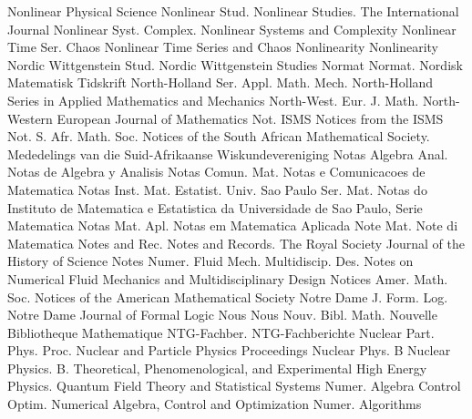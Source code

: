 {Nonlinear Physical Science}
{Nonlinear Stud.}
{Nonlinear Studies. The International Journal}
{Nonlinear Syst. Complex.}
{Nonlinear Systems and Complexity}
{Nonlinear Time Ser. Chaos}
{Nonlinear Time Series and Chaos}
{Nonlinearity}
{Nonlinearity}
{Nordic Wittgenstein Stud.}
{Nordic Wittgenstein Studies}
{Normat}
{Normat. Nordisk Matematisk Tidskrift}
{North-Holland Ser. Appl. Math. Mech.}
{North-Holland Series in Applied Mathematics and Mechanics}
{North-West. Eur. J. Math.}
{North-Western European Journal of Mathematics}
{Not. ISMS}
{Notices from the ISMS}
{Not. S. Afr. Math. Soc.}
{Notices of the South African Mathematical Society. Mededelings van die Suid-Afrikaanse Wiskundevereniging}
{Notas Algebra Anal.}
{Notas de Algebra y Analisis}
{Notas Comun. Mat.}
{Notas e Comunicacoes de Matematica}
{Notas Inst. Mat. Estatist. Univ. Sao Paulo Ser. Mat.}
{Notas do Instituto de Matematica e Estatistica da Universidade de Sao Paulo, Serie Matematica}
{Notas Mat. Apl.}
{Notas em Matematica Aplicada}
{Note Mat.}
{Note di Matematica}
{Notes and Rec.}
{Notes and Records. The Royal Society Journal of the History of Science}
{Notes Numer. Fluid Mech. Multidiscip. Des.}
{Notes on Numerical Fluid Mechanics and Multidisciplinary Design}
{Notices Amer. Math. Soc.}
{Notices of the American Mathematical Society}
{Notre Dame J. Form. Log.}
{Notre Dame Journal of Formal Logic}
{Nous}
{Nous}
{Nouv. Bibl. Math.}
{Nouvelle Bibliotheque Mathematique}
{NTG-Fachber.}
{NTG-Fachberichte}
{Nuclear Part. Phys. Proc.}
{Nuclear and Particle Physics Proceedings}
{Nuclear Phys. B}
{Nuclear Physics. B. Theoretical, Phenomenological, and Experimental High Energy Physics. Quantum Field Theory and Statistical Systems}
{Numer. Algebra Control Optim.}
{Numerical Algebra, Control and Optimization}
{Numer. Algorithms}
